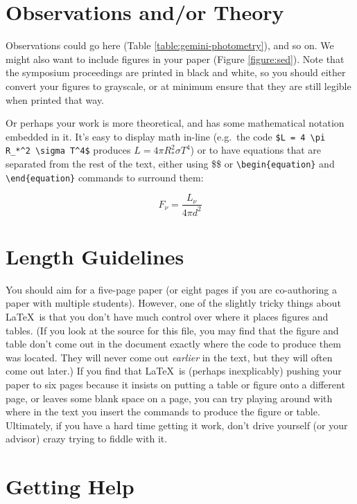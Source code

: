 \documentclass{knac}
\begin{document}
\section{Observations and/or Theory}

Observations could go here (Table \ref{table:gemini-photometry}), and
so on.  We might also want to include figures in your paper (Figure
\ref{figure:sed}).   Note that the symposium proceedings are printed in
black and white, so you should either convert your figures to
grayscale, or at minimum ensure that they are still legible when
printed that way.

Or perhaps your work is more theoretical, and has some mathematical
notation embedded in it.  It's easy to display math in-line (e.g.\ the 
code  \verb|$L = 4 \pi R_*^2 \sigma T^4$| produces $L = 4
\pi R_*^2 \sigma T^4$) or to have equations that are separated from
the rest of the text, either using \$\$ or  \verb|\begin{equation}|
and  \verb|\end{equation}|  commands to surround them: 

\begin{equation}
F_\nu = \frac{L_\nu}{4\pi d^2}
\end{equation}




\section{Length Guidelines}

You should aim for a five-page paper (or eight pages if you are
co-authoring a paper with multiple students).  However, one of the
slightly tricky things about \LaTeX\ is that you don't have much
control over where it places figures and tables. (If you look at the
source for this file, you may find that the figure and table don't
come out in the document exactly where the code to produce them was
located.  They will never come out {\em earlier} in the text, but they
will often come out later.)  If you find that \LaTeX\ is (perhaps
inexplicably) pushing your paper to six pages because it insists on
putting a table or figure onto a different page, or leaves some blank
space on a page, you can try playing around with where in the text you
insert the commands to produce the figure or table.  Ultimately, if
you have a hard time getting it work, don't drive yourself (or your
advisor) crazy trying to fiddle with it.

\section{Getting Help}
\end{document}
